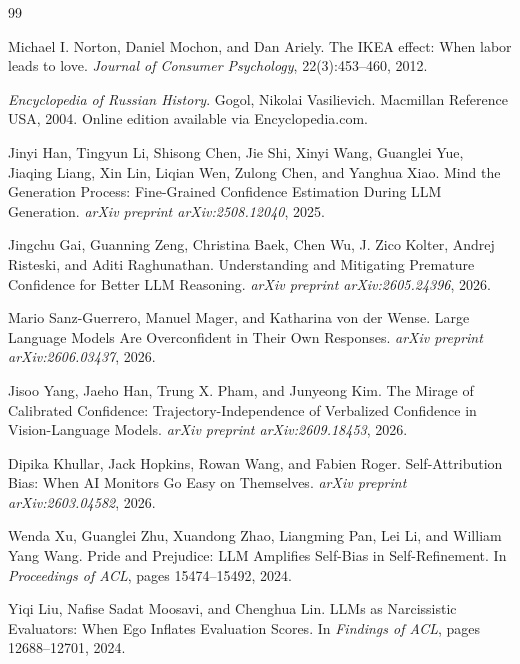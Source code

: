 \documentclass[10pt]{article}
\begin{document}
\begin{thebibliography}{99}

Michael I. Norton, Daniel Mochon, and Dan Ariely.
\newblock The IKEA effect: When labor leads to love.
\newblock \emph{Journal of Consumer Psychology}, 22(3):453--460, 2012.

\emph{Encyclopedia of Russian History}.
\newblock Gogol, Nikolai Vasilievich.
\newblock Macmillan Reference USA, 2004. Online edition available via Encyclopedia.com.

Jinyi Han, Tingyun Li, Shisong Chen, Jie Shi, Xinyi Wang, Guanglei Yue, Jiaqing Liang, Xin Lin, Liqian Wen, Zulong Chen, and Yanghua Xiao.
\newblock Mind the Generation Process: Fine-Grained Confidence Estimation During LLM Generation.
\newblock \emph{arXiv preprint arXiv:2508.12040}, 2025.

Jingchu Gai, Guanning Zeng, Christina Baek, Chen Wu, J. Zico Kolter, Andrej Risteski, and Aditi Raghunathan.
\newblock Understanding and Mitigating Premature Confidence for Better LLM Reasoning.
\newblock \emph{arXiv preprint arXiv:2605.24396}, 2026.

Mario Sanz-Guerrero, Manuel Mager, and Katharina von der Wense.
\newblock Large Language Models Are Overconfident in Their Own Responses.
\newblock \emph{arXiv preprint arXiv:2606.03437}, 2026.

Jisoo Yang, Jaeho Han, Trung X. Pham, and Junyeong Kim.
\newblock The Mirage of Calibrated Confidence: Trajectory-Independence of Verbalized Confidence in Vision-Language Models.
\newblock \emph{arXiv preprint arXiv:2609.18453}, 2026.

Dipika Khullar, Jack Hopkins, Rowan Wang, and Fabien Roger.
\newblock Self-Attribution Bias: When AI Monitors Go Easy on Themselves.
\newblock \emph{arXiv preprint arXiv:2603.04582}, 2026.

Wenda Xu, Guanglei Zhu, Xuandong Zhao, Liangming Pan, Lei Li, and William Yang Wang.
\newblock Pride and Prejudice: LLM Amplifies Self-Bias in Self-Refinement.
\newblock In \emph{Proceedings of ACL}, pages 15474--15492, 2024.

Yiqi Liu, Nafise Sadat Moosavi, and Chenghua Lin.
\newblock LLMs as Narcissistic Evaluators: When Ego Inflates Evaluation Scores.
\newblock In \emph{Findings of ACL}, pages 12688--12701, 2024.


\end{thebibliography}
\end{document}
